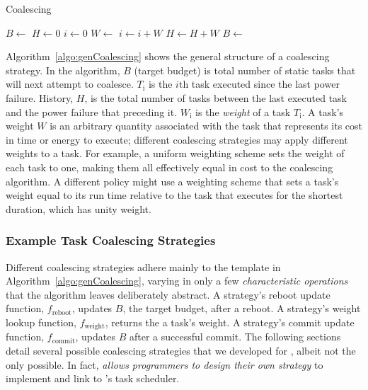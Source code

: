 \begin{algorithm}[t]
	\caption{Coalescing}
	\label{algo:genCoalescing}
	\scriptsize
	\begin{algorithmic}[1]
        \State $B \leftarrow $ 
        \State $H \gets 0$ 
	        \State $ i \gets 0$
		        \State {}
		        \State $W \leftarrow $ 
		        \State $i \gets i + W$
				\State $H \gets H + W$
	        \EndWhile
	        \State {}
	        \State $B \leftarrow $ 
        \EndWhile
	\end{algorithmic}
\end{algorithm}

Algorithm~\ref{algo:genCoalescing} shows the general structure of a coalescing strategy. In the algorithm, $B$ (target budget) is total number of static tasks that \sys will next attempt to coalesce. $T_\text{i}$ is the $i$th task executed since the last power failure. History, $H$, is the total number of tasks between the last executed task and the power failure that preceding it. $W_\text{i}$ is the {\em weight} of a task $T_\text{i}$. A task's weight $W$ is an arbitrary quantity associated with the task that represents its cost in time or energy to execute; different coalescing strategies may apply different weights to a task. For example, a uniform weighting scheme sets the weight of each task to one, making them all effectively equal in cost to the coalescing algorithm.  A different policy might use a weighting scheme that sets a task's weight equal to its run time relative to the task that executes for the shortest duration, which has unity weight. 

\subsubsection{Example Task Coalescing Strategies}
\label{subsec:coalescingStrategies}

Different coalescing strategies adhere mainly to the template in Algorithm~\ref{algo:genCoalescing}, varying in only a few {\em characteristic operations} that the algorithm leaves deliberately abstract. A strategy's reboot update function, $f_\text{reboot}$, updates $B$, the target budget, after a reboot. A strategy's weight lookup function, $f_\text{weight}$, returns the a task's weight.  A strategy's commit update function, $f_\text{commit}$, updates $B$ after a successful commit. The following sections detail several possible coalescing strategies that we developed for \sys, albeit not the only possible. In fact, \sys \emph{allows programmers to design their own strategy} to implement and link to \sys's task scheduler. 

